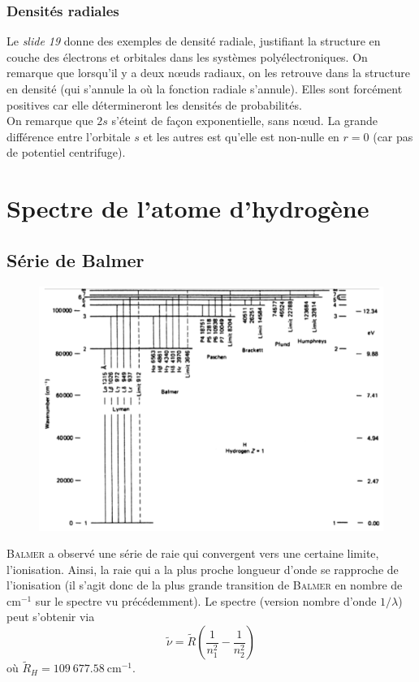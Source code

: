 \subsubsection{Densités radiales}
Le \textit{slide 19} donne des exemples de densité radiale, justifiant la structure en couche des 
électrons et orbitales dans les systèmes polyélectroniques. On remarque que lorsqu'il y a deux nœuds 
radiaux, on les retrouve dans la structure en densité (qui s'annule la où la fonction radiale s'annule). Elles
sont forcément positives car elle détermineront les densités de probabilités.\\

On remarque que $2s$ s'éteint de façon exponentielle, sans nœud. La grande différence entre l'orbitale $s$ et
les autres est qu'elle est non-nulle en $r=0$ (car pas de potentiel centrifuge).


\section{Spectre de l’atome d’hydrogène}

\subsection{Série de Balmer}
	\begin{figure}
	\vspace{-5mm}
	\includegraphics[scale=0.4]{ch1/image4}
	\end{figure}
\textsc{Balmer} a observé une série de raie qui convergent vers une certaine limite, l'ionisation. Ainsi, la
raie qui a la plus proche longueur d'onde se rapproche de l'ionisation (il s'agit donc de la plus grande 
transition de \textsc{Balmer} en nombre de cm$^{-1}$ sur le spectre vu précédemment). Le spectre (version 
nombre d'onde $1/\lambda$) peut s'obtenir via
\begin{equation}
\tilde{\nu} = \tilde{R}\left(\frac{1}{n_1^2}-\frac{1}{n_2^2}\right)
\end{equation}
où $\tilde{R}_H = 109\ 677.58\ \text{cm}^{-1}$.\\


